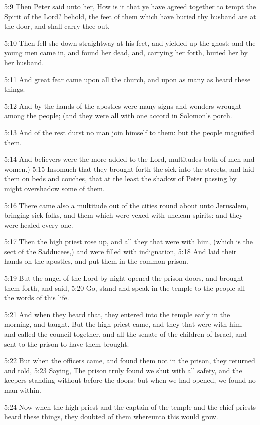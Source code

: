 5:9 Then Peter said unto her, How is it that ye have agreed together
to tempt the Spirit of the Lord? behold, the feet of them which have
buried thy husband are at the door, and shall carry thee out.

5:10 Then fell she down straightway at his feet, and yielded up the
ghost: and the young men came in, and found her dead, and, carrying
her forth, buried her by her husband.

5:11 And great fear came upon all the church, and upon as many as
heard these things.

5:12 And by the hands of the apostles were many signs and wonders
wrought among the people; (and they were all with one accord in
Solomon's porch.

5:13 And of the rest durst no man join himself to them: but the people
magnified them.

5:14 And believers were the more added to the Lord, multitudes both of
men and women.)  5:15 Insomuch that they brought forth the sick into
the streets, and laid them on beds and couches, that at the least the
shadow of Peter passing by might overshadow some of them.

5:16 There came also a multitude out of the cities round about unto
Jerusalem, bringing sick folks, and them which were vexed with unclean
spirits: and they were healed every one.

5:17 Then the high priest rose up, and all they that were with him,
(which is the sect of the Sadducees,) and were filled with
indignation, 5:18 And laid their hands on the apostles, and put them
in the common prison.

5:19 But the angel of the Lord by night opened the prison doors, and
brought them forth, and said, 5:20 Go, stand and speak in the temple
to the people all the words of this life.

5:21 And when they heard that, they entered into the temple early in
the morning, and taught. But the high priest came, and they that were
with him, and called the council together, and all the senate of the
children of Israel, and sent to the prison to have them brought.

5:22 But when the officers came, and found them not in the prison,
they returned and told, 5:23 Saying, The prison truly found we shut
with all safety, and the keepers standing without before the doors:
but when we had opened, we found no man within.

5:24 Now when the high priest and the captain of the temple and the
chief priests heard these things, they doubted of them whereunto this
would grow.

